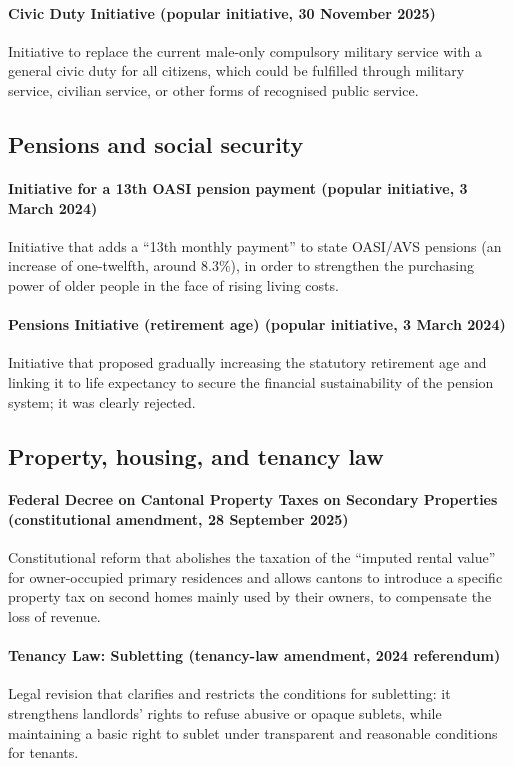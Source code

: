 \documentclass[11pt]{article}
\begin{document}
\paragraph{Civic Duty Initiative (popular initiative, 30 November 2025)}
Initiative to replace the current male-only compulsory military service with a general civic duty for all citizens, which could be fulfilled through military service, civilian service, or other forms of recognised public service.

\subsection*{Pensions and social security}

\paragraph{Initiative for a 13th OASI pension payment (popular initiative, 3 March 2024)}
Initiative that adds a ``13th monthly payment'' to state OASI/AVS pensions (an increase of one-twelfth, around 8.3\%), in order to strengthen the purchasing power of older people in the face of rising living costs.

\paragraph{Pensions Initiative (retirement age) (popular initiative, 3 March 2024)}
Initiative that proposed gradually increasing the statutory retirement age and linking it to life expectancy to secure the financial sustainability of the pension system; it was clearly rejected.

\subsection*{Property, housing, and tenancy law}

\paragraph{Federal Decree on Cantonal Property Taxes on Secondary Properties (constitutional amendment, 28 September 2025)}
Constitutional reform that abolishes the taxation of the ``imputed rental value'' for owner-occupied primary residences and allows cantons to introduce a specific property tax on second homes mainly used by their owners, to compensate the loss of revenue.

\paragraph{Tenancy Law: Subletting (tenancy-law amendment, 2024 referendum)}
Legal revision that clarifies and restricts the conditions for subletting: it strengthens landlords’ rights to refuse abusive or opaque sublets, while maintaining a basic right to sublet under transparent and reasonable conditions for tenants.
\end{document}
